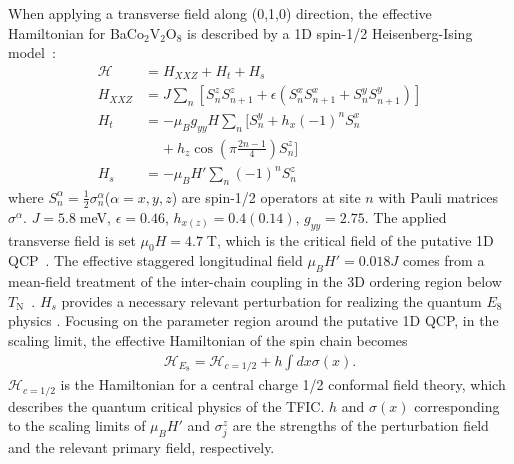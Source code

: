 \documentclass[aps,prl,twocolumn,superscriptaddress,groupedaddress]{revtex4}
\begin{document}

When applying a transverse field along (0,1,0) direction, the effective Hamiltonian for BaCo$_2$V$_2$O$_8$ is described by a 1D spin-1/2 Heisenberg-Ising model~\cite{Kimura_2013,Weiqiang2019,Zou_2021,PhysRevB.101.220411,Zou_2019}:
\begin{equation}
\begin{aligned}
 \mathcal{H} &=H_{XXZ}+H_{t}+H_{s}\\
H_{XXZ}&= J\sum_{n}[S^z_{n}S^z_{n+1}+\epsilon(S^x_{n}S^x_{n+1}+S^y_{n}S^y_{n+1})]\\
H_{t}&=-\mu_{B}g_{yy}H\sum_{n}[S^y_{n}+h_{x}(-1)^{n}S^{x}_{n}\\
& \;\;\;\; +h_{z}\cos(\pi\frac{2n-1}{4})S^z_{n}]\\
H_{s}&=-\mu_{B}H'\sum_{n}(-1)^n S^{z}_{n}
\label{eq:Hamil}
\end{aligned}
\end{equation}
where $S^{\alpha}_{n} = \frac{1}{2}\sigma^{\alpha}_{n}$($\alpha=x,y,z$) are spin-1/2 operators at site $n$ with Pauli matrices $\sigma^{\alpha}$. $J=5.8\;$meV, $\epsilon=0.46$, $h_{x(z)}=0.4(0.14)$, $g_{yy}=2.75$. The applied transverse field is set $\mu_{0}H=4.7\;$T, which is the critical field of the putative 1D QCP~\cite{Zou_2019,Zou_2021}. The effective staggered longitudinal field $\mu_{B}H'=0.018J$ comes from a mean-field treatment of the inter-chain coupling in the 3D ordering region below $T_{\mathrm{N}}$~\cite{Faure:2017iup,Zou_2021}.
 $H_s$ provides a necessary relevant perturbation for realizing the quantum $E_8$ physics \cite{Zou_2021}. Focusing on the parameter region around the putative 1D QCP, in the scaling limit, the effective Hamiltonian of the spin chain becomes~\cite{DELFINO1995724,Zou_2021,xiao_2021}
\begin{align}
\mathcal{H}_{E_8}=\mathcal{H}_{c=1/2}+h\int dx \sigma(x).
\label{eq:E8Hamil}
\end{align}
$\mathcal{H}_{c=1/2}$ is the Hamiltonian for a central charge 1/2 conformal
field theory, which describes the quantum critical physics of the TFIC.
$h$ and $\sigma (x)$ corresponding to the scaling limits of $\mu_{B}H'$ and $\sigma_j^z$
are the strengths of the perturbation field and the relevant primary field, respectively.
\end{document}
